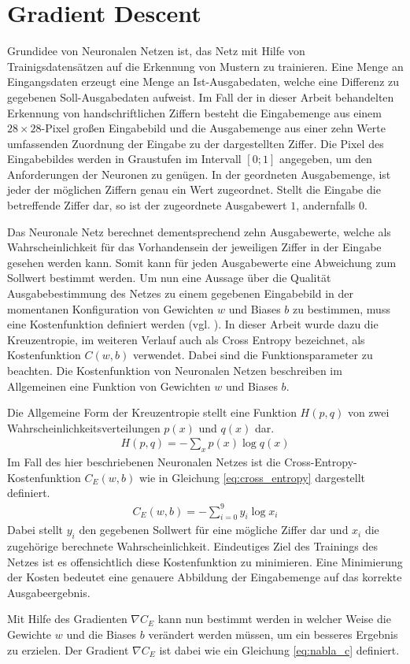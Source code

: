 \documentclass[../main.tex]{subfiles}
\begin{document}
\section{Gradient Descent}
Grundidee von Neuronalen Netzen ist, das Netz mit Hilfe von Trainigsdatensätzen auf die Erkennung von Mustern zu trainieren. Eine Menge an Eingangsdaten erzeugt eine Menge an Ist-Ausgabedaten, welche eine Differenz zu gegebenen Soll-Ausgabedaten aufweist. Im Fall der in dieser Arbeit behandelten Erkennung von handschriftlichen Ziffern besteht die Eingabemenge aus einem $28\times28$-Pixel großen Eingabebild und die Ausgabemenge aus einer zehn Werte umfassenden Zuordnung der Eingabe zu der dargestellten Ziffer. Die Pixel des Eingabebildes werden in Graustufen im Intervall $[0;1]$ angegeben, um den Anforderungen der Neuronen zu genügen. In der geordneten Ausgabemenge, ist jeder der möglichen Ziffern genau ein Wert zugeordnet. Stellt die Eingabe die betreffende Ziffer dar, so ist der zugeordnete Ausgabewert $1$, andernfalls $0$. \par Das Neuronale Netz berechnet dementsprechend zehn Ausgabewerte, welche als Wahrscheinlichkeit für das Vorhandensein der jeweiligen Ziffer in der Eingabe gesehen werden kann. Somit kann für jeden Ausgabewerte eine Abweichung zum Sollwert bestimmt werden. Um nun eine Aussage über die Qualität Ausgabebestimmung des Netzes zu einem gegebenen Eingabebild in der momentanen Konfiguration von Gewichten $w$ und Biases $b$ zu bestimmen, muss eine Kostenfunktion definiert werden (vgl. \cite{NNADL_cost_1}). In dieser Arbeit wurde dazu die Kreuzentropie, im weiteren Verlauf auch als Cross Entropy bezeichnet, als Kostenfunktion $C(w,b)$ verwendet. Dabei sind die Funktionsparameter zu beachten. Die Kostenfunktion von Neuronalen Netzen beschreiben im Allgemeinen eine Funktion von Gewichten $w$ und Biases $b$. \par 
Die Allgemeine Form der Kreuzentropie stellt eine Funktion $H(p,q)$ von zwei Wahrscheinlichkeitsverteilungen $p(x)$ und $q(x)$ dar.
\begin{align}
	H(p,q) = - \sum_{x} p(x)\log q(x)
\end{align}
Im Fall des hier beschriebenen Neuronalen Netzes ist die Cross-Entropy-Kostenfunktion $C_E(w,b)$ wie in Gleichung \ref{eq:cross_entropy} dargestellt definiert.
\begin{align}
	C_E(w,b) = - \sum_{i=0}^{9} y_i\log x_i \label{eq:cross_entropy}
\end{align}
Dabei stellt $y_i$ den gegebenen Sollwert für eine mögliche Ziffer dar und $x_i$ die zugehörige berechnete Wahrscheinlichkeit. Eindeutiges Ziel des Trainings des Netzes ist es offensichtlich diese Kostenfunktion zu minimieren. Eine Minimierung der Kosten bedeutet eine genauere Abbildung der Eingabemenge auf das korrekte Ausgabeergebnis. \par Mit Hilfe des Gradienten $\nabla C_E$ kann nun bestimmt werden in welcher Weise die Gewichte $w$ und die Biases $b$ verändert werden müssen, um ein besseres Ergebnis zu erzielen. Der Gradient $\nabla C_E$ ist dabei wie ein Gleichung \ref{eq:nabla_c} definiert.
\end{document}
